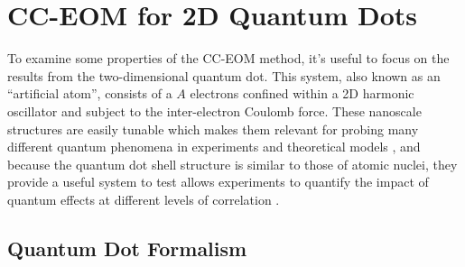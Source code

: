 \documentclass[thesis.tex]{subfiles}
\begin{document}
\section{CC-EOM for 2D Quantum Dots} \label{section:eom_target_states}

To examine some properties of the CC-EOM method, it's useful to focus on the results from the two-dimensional quantum dot.  This system, also known as an ``artificial atom'', consists of a $A$ electrons confined within a 2D harmonic oscillator and subject to the inter-electron Coulomb force.  These nanoscale structures are easily tunable which makes them relevant for probing many different quantum phenomena in experiments and theoretical models \cite{reimann2002,engel1993,BIRMAN20131}, and because the quantum dot shell structure is similar to those of atomic nuclei, they provide a useful system to test  allows experiments to quantify the impact of quantum effects at different levels of correlation \cite{tarucha1996}.

\subsection{Quantum Dot Formalism}
\end{document}
